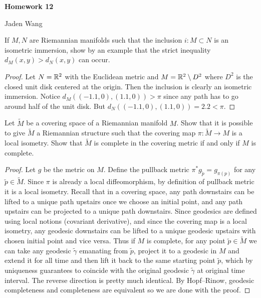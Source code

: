\documentclass[12pt]{article}
\begin{document}
\centerline {\textsf{\textbf{\LARGE{Homework 12}}}}
\centerline {Jaden Wang}
\vspace{.15in}

\begin{problem}[7.1]
If $ M,N$ are Riemannian manifolds such that the inclusion  $ i: M \subset N$ is an isometric immersion, show by an example that the strict inequality $ d_M(x,y) > d_N(x,y)$ can occur.
\end{problem}
\begin{proof}
Let $ N= \mathbb{R}^2$ with the Euclidean metric and $ M= \mathbb{R}^2 \setminus D^2$ where $ D^2$ is the closed unit disk centered at the origin. Then the inclusion is clearly an isometric immersion. Notice  $ d_M((-1.1,0),(1.1,0)) > \pi$ since any path has to go around half of the unit disk. But $ d_N((-1.1,0),(1.1,0)) = 2.2 < \pi$. 
\end{proof}
\begin{problem}[7.2]
Let $ \widetilde{ M}$ be a covering space of a Riemannian manifold $ M$. Show that it is possible to give  $ \widetilde{ M}$ a Riemannian structure such that the covering map $ \pi: \widetilde{ M} \to M$ is a local isometry. Show that $ \widetilde{ M}$ is complete in the covering metric if and only if $ M$ is complete.
\end{problem}
\begin{proof}
	Let $ g$ be the metric on  $ M$. Define the pullback metric $ \pi^{*}g_{\widetilde{ p}} = g_{\pi(p)}$ for any $ \widetilde{ p} \in \widetilde{ M}$. Since $ \pi$ is already a local diffeomorphism, by definition of pullback metric it is a local isometry. Recall that in a covering space, any path downstairs can be lifted to a unique path upstairs once we choose an initial point, and any path upstairs can be projected to a unique path downstairs. Since geodesics are defined using local notions (covariant derivative), and since the covering map is a local isometry, any geodesic downstairs can be lifted to a unique geodesic upstairs with chosen initial point and vice versa. Thus if $ M$ is complete, for any point $ \widetilde{ p} \in \widetilde{ M}$ we can take any geodesic $ \widetilde{ \gamma}$ emanating from $ \widetilde{ p}$, project it to a geodesic in $ M$ and extend it for all time and then lift it back to the same starting point $ \widetilde{ p}$, which by uniqueness guarantees to coincide with the original geodesic $ \widetilde{ \gamma}$ at original time interval. The reverse direction is pretty much identical. By Hopf--Rinow, geodesic completeness and completeness are equivalent so we are done with the proof.
\end{proof}
\end{document}
